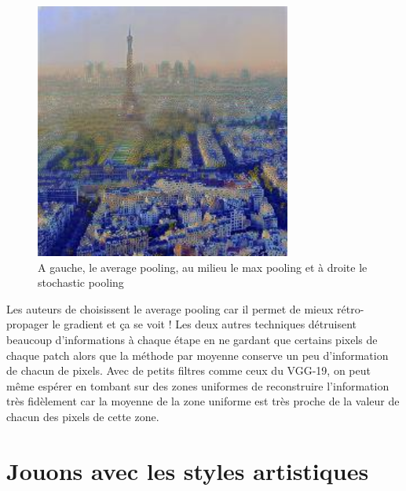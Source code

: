 \documentclass{article}
\begin{document}
\begin{figure}[!htb]
\begin{minipage}{0.33\textwidth}
\includegraphics[width=0.75\textwidth]{../Images/transfer/paris_starrynight_STOCHASTIC.jpg}
\end{minipage}
\caption{A gauche, le average pooling, au milieu le max pooling et à droite le stochastic pooling}
\label{fig:pooling_difference}
\end{figure}

Les auteurs de \cite{DBLP:journals/corr/GatysEB15a} choisissent le average pooling car il permet de mieux rétro-propager le gradient et ça se voit ! Les deux autres techniques détruisent beaucoup d'informations à chaque étape en ne gardant que certains pixels de chaque patch alors que la méthode par moyenne conserve un peu d'information de chacun de pixels. Avec de petits filtres comme ceux du VGG-19, on peut même espérer en tombant sur des zones uniformes de reconstruire l'information très fidèlement car la moyenne de la zone uniforme est très proche de la valeur de chacun des pixels de cette zone.

\section{Jouons avec les styles artistiques}
\end{document}
